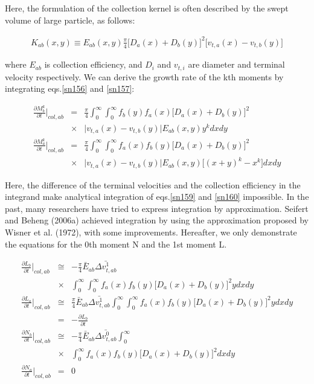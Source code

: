 Here, the formulation of the collection kernel is often described by the swept volume of large particle, as follows:

\begin{eqnarray}
K_{ab}(x,y)\equiv E_{ab}(x,y)\frac{\pi}{4}\bigl[D_{a}(x)+D_{b}(y)\bigr]^{2}\bigl[v_{t,a}(x)-v_{t,b}(y)\bigr]\label{sn158}
\end{eqnarray}

where $E_{ab}$ is collection efficiency, and $D_{i}$ and $v_{t,i}$ are diameter and terminal velocity respectively. We can derive the growth rate of the kth moments by integrating eqs.\ref{sn156} and \ref{sn157}:

\begin{eqnarray}
\frac{\partial M_{b}^{k}}{\partial t}\Bigr|_{col,ab}&=&\frac{\pi}{4}\int_{0}^{\infty}\int_{0}^{\infty}f_{b}(y)f_{a}(x)\bigl[D_{a}(x)+D_{b}(y)\bigr]^{2}\nonumber\\
&\times&\bigl|v_{t,a}(x)-v_{t,b}(y)\bigr|E_{ab}(x,y)y^{k}dxdy\label{sn159}\\
\frac{\partial M_{a}^{k}}{\partial t}\Bigr|_{col,ab}&=&\frac{\pi}{4}\int_{0}^{\infty}\int_{0}^{\infty}f_{a}(x)f_{b}(y)\bigl[D_{a}(x)+D_{b}(y)\bigr]^{2}\nonumber\\
&\times&\bigl|v_{t,a}(x)-v_{t,b}(y)\bigr|E_{ab}(x,y)\bigl[(x+y)^{k}-x^{k}\bigr]dxdy\label{sn160}
\end{eqnarray}

Here, the difference of the terminal velocities and the collection efficiency in the integrand make analytical integration of eqs.\ref{sn159} and \ref{sn160} impossible. In the past, many researchers have tried to express integration by approximation. Seifert and Beheng (2006a) achieved integration by using the approximation proposed by Wisner et al. (1972), with some improvements. Hereafter, we only demonstrate the equations for the 0th moment N and the 1st moment L.

\begin{eqnarray}
\frac{\partial L_{b}}{\partial t}\Bigr|_{col,ab}&\cong&-\frac{\pi}{4}\bar{E}_{ab}\bar{\Delta v_{t,ab}^{1}}\nonumber\\
&\times&\int_{0}^{\infty}\int_{0}^{\infty}f_{a}(x)f_{b}(y)\bigl[D_{a}(x)+D_{b}(y)\bigr]^{2}ydxdy\label{sn161}\\
\frac{\partial L_{a}}{\partial t}\Bigr|_{col,ab}&\cong&\frac{\pi}{4}\bar{E}_{ab}\bar{\Delta v_{t,ab}^{1}}\int_{0}^{\infty}\int_{0}^{\infty}f_{a}(x)f_{b}(y)\bigl[D_{a}(x)+D_{b}(y)\bigr]^{2}ydxdy\nonumber\\
&=&-\frac{\partial L_{b}}{\partial t}\label{sn162}\\
\frac{\partial N_{b}}{\partial t}\Bigr|_{col,ab}&\cong&-\frac{\pi}{4}\bar{E}_{ab}\bar{\Delta v_{t,ab}^{0}}\int_{0}^{\infty}\nonumber\\
&\times&\int_{0}^{\infty}f_{a}(x)f_{b}(y)\bigl[D_{a}(x)+D_{b}(y)\bigr]^{2}dxdy\label{sn163}\\
\frac{\partial N_{a}}{\partial t}\Bigr|_{col,ab}&=&0\label{sn164}
\end{eqnarray}

